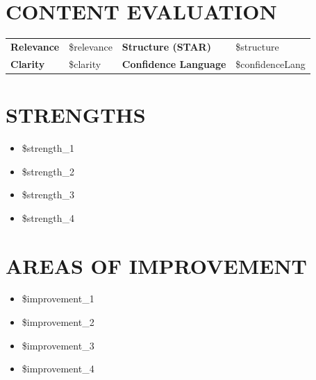 \documentclass[11pt]{article}
\newcommand{\labelcell}[1]{%
  \textbf{\textcolor{WiseNavy}{#1}}%
}
\begin{document}
\vspace{0.4cm}

\section{CONTENT EVALUATION}

\renewcommand{\arraystretch}{1.5}
\begin{tabularx}{\textwidth}{L{4.8cm} X L{4.8cm} X}
  \labelcell{Relevance}           & \${relevance}
    & \labelcell{Structure (STAR)}   & \${structure} \\
  \labelcell{Clarity}             & \${clarity}
    & \labelcell{Confidence Language}& \${confidenceLang} \\
\end{tabularx}
\renewcommand{\arraystretch}{1}

\vspace{0.4cm}

\section{STRENGTHS}

\begin{itemize}[leftmargin=1.5em, itemsep=4pt, parsep=0pt]
  \item \${strength\_1}
  \item \${strength\_2}
  \item \${strength\_3}
  \item \${strength\_4}
\end{itemize}

\vspace{0.4cm}

\section{AREAS OF IMPROVEMENT}

\begin{itemize}[leftmargin=1.5em, itemsep=4pt, parsep=0pt]
  \item \${improvement\_1}
  \item \${improvement\_2}
  \item \${improvement\_3}
  \item \${improvement\_4}
\end{itemize}
\end{document}
